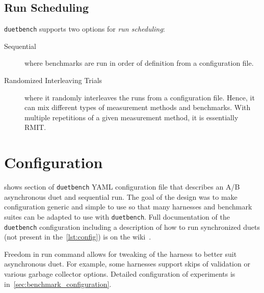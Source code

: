 \subsection{Run Scheduling}
\label{sec:scheduling}

\lstinline{duetbench} supports two options for \emph{run scheduling}:
\begin{description}
    \item[Sequential] where benchmarks are run in order of definition from a configuration file.
    \item[Randomized Interleaving Trials] where it randomly interleaves the runs from a configuration file.
        Hence, it can mix different types of measurement methods and benchmarks.
        With multiple repetitions of a given measurement method, it is essentially RMIT\cite{abedi2017conducting}.
\end{description}

\section{Configuration}
\label{sec:configuration}

 shows section of \lstinline{duetbench} YAML configuration file that describes an A/B asynchronous duet and sequential run.
The goal of the design was to make configuration generic and simple to use so that many harnesses and benchmark suites can be adapted to use with \lstinline{duetbench}.
Full documentation of the \lstinline{duetbench} configuration including a description of how to run synchronized duets (not present in the~\cref{lst:config}) is on the wiki~\cite{wiki}.

Freedom in run command allows for tweaking of the harness to better suit asynchronous duet.
For example, some harnesses support skips of validation or various garbage collector options.
Detailed configuration of experiments is in~\cref{sec:benchmark_configuration}.

